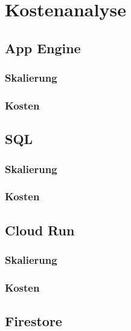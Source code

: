 \chapter{Kostenanalyse}
\label{cha:kostenanalyse}



\section{App Engine}
\blindtext

\subsection*{Skalierung}
\blindtext

\subsection*{Kosten}
\sblindtext


\section{SQL}
\blindtext

\subsection*{Skalierung}
\blindtext

\subsection*{Kosten}
\sblindtext


\section{Cloud Run}
\blindtext

\subsection*{Skalierung}
\blindtext

\subsection*{Kosten}
\sblindtext


\section{Firestore}
\blindtext

